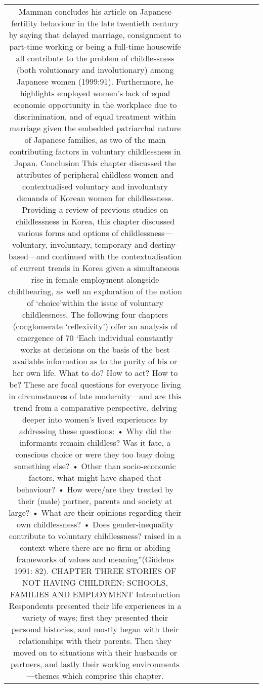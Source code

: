 \begin{table}[h!]
\begin{tabular}{|c|c|c|c|c|c|c|c|c|c|}
Mamman concludes his article on Japanese fertility behaviour in the late twentieth century by saying that delayed marriage, consignment to part-time working or being a full-time housewife all contribute to the problem of childlessness (both volutionary and involutionary) among Japanese women (1999:91). Furthermore, he highlights employed women’s lack of equal economic opportunity in the workplace due to discrimination, and of equal treatment within marriage given the embedded patriarchal nature of Japanese families, as two of the main contributing factors in voluntary childlessness in Japan.
Conclusion
This chapter discussed the attributes of peripheral childless women and contextualised voluntary and involuntary demands of Korean women for childlessness. Providing a review of previous studies on childlessness in Korea, this chapter discussed various forms and options of childlessness—voluntary, involuntary, temporary and destiny-based—and continued with the contextualisation of current trends in Korea given a simultaneous rise in female employment alongside childbearing, as well an exploration of the notion of ‘choice’within the issue of voluntary childlessness.
The following four chapters (conglomerate ‘reflexivity’) offer an analysis of emergence of
70 ‘Each individual constantly works at decisions on the basis of the best available information as to the purity of his or her own life. What to do? How to act? How to be? These are focal questions for everyone living in circumstances of late modernity—and are
this trend from a comparative perspective, delving deeper into women’s lived experiences by addressing these questions:
• Why did the informants remain childless? Was it fate, a conscious choice or were they too busy doing something else? • Other than socio-economic factors, what might have shaped that behaviour? • How were/are they treated by their (male) partner, parents and society at large? • What are their opinions regarding their own childlessness? • Does gender-inequality contribute to voluntary childlessness? raised in a context where there are no firm or abiding frameworks of values and meaning”(Giddens 1991: 82).
CHAPTER THREE
STORIES OF NOT HAVING CHILDREN: SCHOOLS, FAMILIES AND
EMPLOYMENT
Introduction
Respondents presented their life experiences in a variety of ways; first they presented their personal histories, and mostly began with their relationships with their parents.
Then they moved on to situations with their husbands or partners, and lastly their working environments—themes which comprise this chapter.

\end{tabular}
\end{table}

